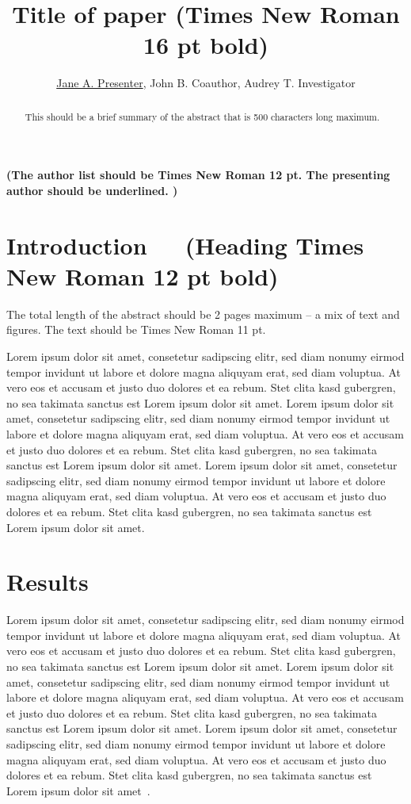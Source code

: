 \documentclass{itqwconf}
\title{Title of paper (Times New Roman 16 pt bold)}
\author{\underline{Jane A. Presenter}\authormark{1*},
  John B. Coauthor\authormark{1},
  Audrey T. Investigator\authormark{1}}
\affil[1]{Department of Electrical Engineering,
  University of California Los Angeles (UCLA) Los Angeles, CA 90095,
  USA~~~(10 pt. Times New Roman)}
\begin{document}
\maketitle

{
  \large
  \textbf{(The author list should be Times New Roman 12 pt. The presenting
    author should be underlined. )}
  \vskip12pt
}

\begin{abstract}
  This should be a brief summary of the abstract that is 500 characters long
  maximum.
\end{abstract}

\section{Introduction~~~(Heading Times New Roman 12 pt bold)}

The total length of the abstract should be 2 pages maximum -- a mix of text
and figures. The text should be Times New Roman 11 pt.

Lorem ipsum dolor sit amet, consetetur sadipscing elitr, sed diam nonumy
eirmod tempor invidunt ut labore et dolore magna aliquyam erat, sed diam
voluptua. At vero eos et accusam et justo duo dolores et ea rebum. Stet clita
kasd gubergren, no sea takimata sanctus est Lorem ipsum dolor sit amet. Lorem
ipsum dolor sit amet, consetetur sadipscing elitr, sed diam nonumy eirmod
tempor invidunt ut labore et dolore magna aliquyam erat, sed diam voluptua.
At vero eos et accusam et justo duo dolores et ea rebum. Stet clita kasd
gubergren, no sea takimata sanctus est Lorem ipsum dolor sit amet. Lorem
ipsum dolor sit amet, consetetur sadipscing elitr, sed diam nonumy eirmod
tempor invidunt ut labore et dolore magna aliquyam erat, sed diam voluptua.
At vero eos et accusam et justo duo dolores et ea rebum. Stet clita kasd
gubergren, no sea takimata sanctus est Lorem ipsum dolor sit amet.

\section{Results}

Lorem ipsum dolor sit amet, consetetur sadipscing elitr, sed diam nonumy
eirmod tempor invidunt ut labore et dolore magna aliquyam erat, sed diam
voluptua. At vero eos et accusam et justo duo dolores et ea rebum. Stet clita
kasd gubergren, no sea takimata sanctus est Lorem ipsum dolor sit amet. Lorem
ipsum dolor sit amet, consetetur sadipscing elitr, sed diam nonumy eirmod
tempor invidunt ut labore et dolore magna aliquyam erat, sed diam voluptua.
At vero eos et accusam et justo duo dolores et ea rebum. Stet clita kasd
gubergren, no sea takimata sanctus est Lorem ipsum dolor sit amet. Lorem
ipsum dolor sit amet, consetetur sadipscing elitr, sed diam nonumy eirmod
tempor invidunt ut labore et dolore magna aliquyam erat, sed diam voluptua.
At vero eos et accusam et justo duo dolores et ea rebum. Stet clita kasd
gubergren, no sea takimata sanctus est Lorem ipsum dolor sit
amet~\cite{weber2009density}.
\end{document}
